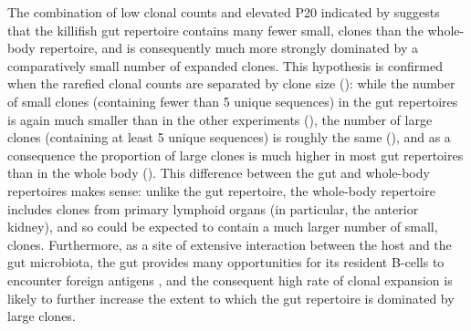 The combination of low clonal counts and elevated P20 indicated by  suggests that the killifish gut repertoire contains many fewer small, \naive clones than the whole-body repertoire, and is consequently much more strongly dominated by a comparatively small number of expanded clones. This hypothesis is confirmed when the rarefied clonal counts are separated by clone size (): while the number of small clones (containing fewer than 5 unique sequences) in the gut repertoires is again much smaller than in the other experiments (), the number of large clones (containing at least 5 unique sequences) is roughly the same (), and as a consequence the proportion of large clones is much higher in most gut repertoires than in the whole body (). This difference between the gut and whole-body repertoires makes sense: unlike the gut repertoire, the whole-body repertoire includes clones from primary lymphoid organs (in particular, the anterior kidney), and so could be expected to contain a much larger number of small, \naive clones. Furthermore, as a site of extensive interaction between the host and the gut microbiota, the gut provides many opportunities for its resident B-cells to encounter foreign antigens \parencite{caruso2009immunosenescence} , and the consequent high rate of clonal expansion is likely to further increase the extent to which the gut repertoire is dominated by large clones.

